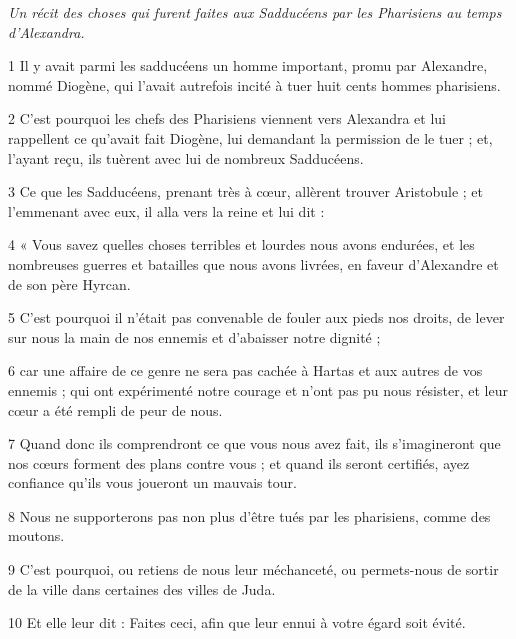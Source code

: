 
\par \textit{Un récit des choses qui furent faites aux Sadducéens par les Pharisiens au temps d'Alexandra.}

\par 1 Il y avait parmi les sadducéens un homme important, promu par Alexandre, nommé Diogène, qui l'avait autrefois incité à tuer huit cents hommes pharisiens.

\par 2 C'est pourquoi les chefs des Pharisiens viennent vers Alexandra et lui rappellent ce qu'avait fait Diogène, lui demandant la permission de le tuer ; et, l'ayant reçu, ils tuèrent avec lui de nombreux Sadducéens.

\par 3 Ce que les Sadducéens, prenant très à cœur, allèrent trouver Aristobule ; et l'emmenant avec eux, il alla vers la reine et lui dit :

\par 4 « Vous savez quelles choses terribles et lourdes nous avons endurées, et les nombreuses guerres et batailles que nous avons livrées, en faveur d'Alexandre et de son père Hyrcan.

\par 5 C'est pourquoi il n'était pas convenable de fouler aux pieds nos droits, de lever sur nous la main de nos ennemis et d'abaisser notre dignité ;

\par 6 car une affaire de ce genre ne sera pas cachée à Hartas et aux autres de vos ennemis ; qui ont expérimenté notre courage et n'ont pas pu nous résister, et leur cœur a été rempli de peur de nous.

\par 7 Quand donc ils comprendront ce que vous nous avez fait, ils s'imagineront que nos cœurs forment des plans contre vous ; et quand ils seront certifiés, ayez confiance qu'ils vous joueront un mauvais tour.

\par 8 Nous ne supporterons pas non plus d'être tués par les pharisiens, comme des moutons.

\par 9 C'est pourquoi, ou retiens de nous leur méchanceté, ou permets-nous de sortir de la ville dans certaines des villes de Juda.

\par 10 Et elle leur dit : Faites ceci, afin que leur ennui à votre égard soit évité.

